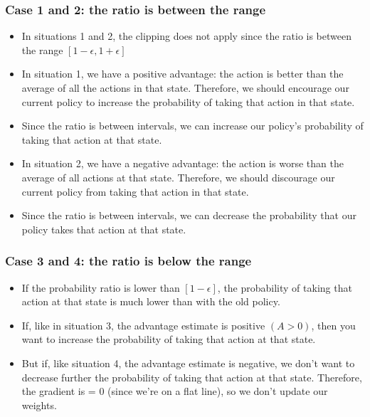 \begin{frame}[fragile]\frametitle{Case 1 and 2: the ratio is between the range}

\begin{itemize}
\item In situations 1 and 2, the clipping does not apply since the ratio is between the range $[1 - \epsilon, 1 + \epsilon]$
\item In situation 1, we have a positive advantage: the action is better than the average of all the actions in that state. Therefore, we should encourage our current policy to increase the probability of taking that action in that state.
\item Since the ratio is between intervals, we can increase our policy's probability of taking that action at that state.
\item In situation 2, we have a negative advantage: the action is worse than the average of all actions at that state. Therefore, we should discourage our current policy from taking that action in that state.
\item Since the ratio is between intervals, we can decrease the probability that our policy takes that action at that state.
\end{itemize}


\end{frame}

\begin{frame}[fragile]\frametitle{Case 3 and 4: the ratio is below the range}

\begin{itemize}
\item If the probability ratio is lower than $[1 - \epsilon]$, the probability of taking that action at that state is much lower than with the old policy.
\item If, like in situation 3, the advantage estimate is positive $(A>0)$, then you want to increase the probability of taking that action at that state.
\item 
But if, like situation 4, the advantage estimate is negative, we don't want to decrease further the probability of taking that action at that state. Therefore, the gradient is = 0 (since we're on a flat line), so we don't update our weights.
\end{itemize}


\end{frame}

